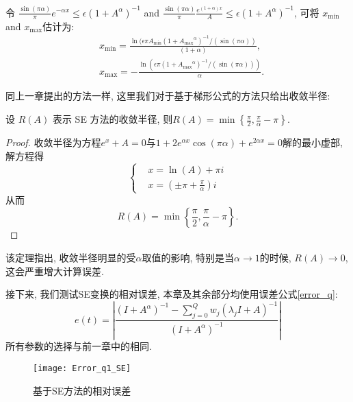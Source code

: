 令 $ \frac{\sin(\pi \alpha)}{\pi} e^{-\alpha  x}\leq \epsilon (1+{A}^{\alpha})^{-1}$ and  $\frac{\sin(\pi \alpha)}{\pi} \frac{ e^{(1+\alpha) x}}{A} \leq \epsilon (1+{A}^{\alpha})^{-1}$, 可将 $x_{\min}$ and $x_{\max}$估计为:
\begin{equation}
	\begin{aligned}
		&x_{\min}= \frac{\ln(\epsilon \pi  A_{\min} (1+{A_{\max}}^{\alpha})^{-1}/(\sin(\pi \alpha))}{(1+\alpha)},\\
		&x_{\max}=-\frac{\ln(\epsilon \pi (1+{A_{\max}}^{\alpha})^{-1}/(\sin(\pi \alpha)))}{\alpha }.
	\end{aligned}
	\label{findminmax_SE_q1}
\end{equation}

同上一章提出的方法一样, 这里我们对于基于梯形公式的方法只给出收敛半径: 
\begin{theorem}
	设 \( R(A) \) 表示 SE 方法的收敛半径, 则\(R(A)=\min\left\{\frac{\pi}{2},\frac{\pi}{\alpha}-\pi\right\}.\)
\end{theorem}
\begin{proof}	
	收敛半径为方程\(e^x+A=0\)与\(1+2e^{\alpha x}\cos(\pi\alpha)+e^{2\alpha x}=0\)解的最小虚部,解方程得
	\begin{equation}\left\{
		\begin{aligned}
			&x=\ln(A)+\pi i\\
			&x=\left(\pm\pi+\frac{\pi}{\alpha}\right)i
		\end{aligned}\right.
	\end{equation}
	从而
	\begin{equation}
		R(A)=\min\left\{\frac{\pi}{2},\frac{\pi}{\alpha}-\pi\right\}.
	\end{equation}
\end{proof}

该定理指出, 收敛半径明显的受\(\alpha\)取值的影响, 特别是当\(\alpha\rightarrow 1\)的时候, \(R(A)\rightarrow 0\), 这会严重增大计算误差. 

接下来, 我们测试SE变换的相对误差, 本章及其余部分均使用误差公式\eqref{error_q}: 
\begin{equation}
	e(t)=\left|\frac{(I+{A}^{\alpha})^{-1}-\sum_{j=0}^{Q}w_j(\lambda_jI+A)^{-1}}{(I+{A}^{\alpha})^{-1}}\right|
	\label{error_q}
\end{equation}
所有参数的选择与前一章中的相同. 
\begin{figure}[htbp]
	\centering
	\texttt{[image: Error\_q1\_SE]}
	\caption{基于SE方法的相对误差}
	\label{E_SE_q1}
\end{figure}

